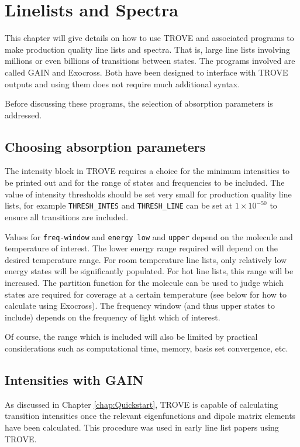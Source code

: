 
\chapter{Linelists and Spectra}
\label{chap:linelists}

This chapter will give details on how to use TROVE and associated programs to make production quality line 
lists and spectra. That is, large line lists involving millions or even billions of transitions between states. 
The programs involved are called GAIN and Exocross. Both have been designed to interface with TROVE 
outputs and using them does not require much additional syntax. 

Before discussing these programs, the selection of absorption parameters is addressed.

\section{Choosing absorption parameters}

The intensity block in TROVE requires a choice for the minimum intensities to be printed out and for the range of
states and frequencies to be included. The value of intensity thresholds should be set very small for production quality 
line lists, for example \verb|THRESH_INTES| and \verb|THRESH_LINE| can be set at $1\times 10^{-50}$ to ensure all transitions
are included.

Values for \verb|freq-window| and \verb|energy low| and \verb|upper| depend on the molecule and temperature of interest. The
lower energy range required will depend on the desired temperature range. For room temperature line lists, only relatively 
low energy states will be significantly populated. For hot line lists, this range will be increased. The partition function
for the molecule can be used to judge which states are required for coverage at a certain temperature (see below for how
to calculate using Exocross). The frequency window (and thus upper states to include) depends on the frequency of light which of interest. 

Of course, the range which is included will also be limited by practical considerations such as computational time, memory, 
basis set convergence, etc. 

\section{Intensities with GAIN}

As discussed in Chapter \ref{chap:Quickstart}, TROVE is capable of calculating transition intensities once the relevant 
eigenfunctions and dipole matrix elements have been calculated. This procedure was used in early line list papers using
TROVE.\cite{jt466,jt500,jt580}


